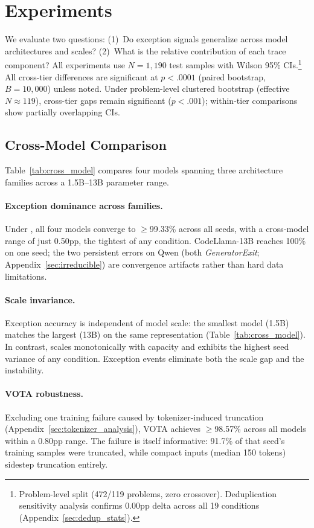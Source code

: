 \section{Experiments}

We evaluate two questions:
(1)~Do exception signals generalize across model architectures and scales?
(2)~What is the relative contribution of each trace component?
All experiments use $N{=}1{,}190$ test samples with Wilson 95\% CIs.\footnote{Problem-level split (472/119 problems, zero crossover). Deduplication sensitivity analysis confirms 0.00pp delta across all 19 conditions (Appendix~\ref{sec:dedup_stats}).}
All cross-tier differences are significant at $p{<}.0001$ (paired bootstrap, $B{=}10{,}000$) unless noted.
Under problem-level clustered bootstrap (effective $N{\approx}119$), cross-tier gaps remain significant ($p{<}.001$); within-tier comparisons show partially overlapping CIs.

\subsection{Cross-Model Comparison}
\label{sec:cross_model}

Table~\ref{tab:cross_model} compares four models spanning three architecture families across a 1.5B--13B parameter range.

\paragraph{Exception dominance across families.}
Under , all four models converge to ${\geq}$99.33\% across all seeds, with a cross-model range of just 0.50pp, the tightest of any condition.
CodeLlama-13B reaches 100\% on one seed; the two persistent errors on Qwen (both \textit{GeneratorExit}; Appendix~\ref{sec:irreducible}) are convergence artifacts rather than hard data limitations.

\paragraph{Scale invariance.}
Exception accuracy is independent of model scale: the smallest model (1.5B) matches the largest (13B) on the same representation (Table~\ref{tab:cross_model}).
In contrast,  scales monotonically with capacity and exhibits the highest seed variance of any condition.
Exception events eliminate both the scale gap and the instability.

\paragraph{VOTA robustness.}
Excluding one training failure caused by tokenizer-induced truncation (Appendix~\ref{sec:tokenizer_analysis}), VOTA achieves ${\geq}$98.57\% across all models within a 0.80pp range.
The failure is itself informative: 91.7\% of that seed's training samples were truncated, while compact  inputs (median 150 tokens) sidestep truncation entirely.


